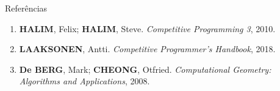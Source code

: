 \begin{frame}[fragile]{Referências}

    \begin{enumerate}
        \item \textbf{HALIM}, Felix; \textbf{HALIM}, Steve. \textit{Competitive Programming 3}, 2010.
        \item \textbf{LAAKSONEN}, Antti. \textit{Competitive Programmer's Handbook}, 2018.

        \item \textbf{De BERG}, Mark; \textbf{CHEONG}, Otfried. \textit{Computational Geometry: Algorithms and Applications}, 2008.
    \end{enumerate}

\end{frame}
